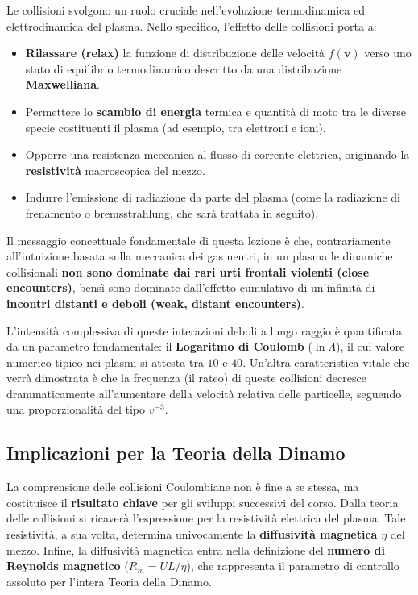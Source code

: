 Le collisioni svolgono un ruolo cruciale nell'evoluzione termodinamica ed elettrodinamica del plasma. Nello specifico, l'effetto delle collisioni porta a:
\begin{itemize}
\item \textbf{Rilassare (relax)} la funzione di distribuzione delle velocità $f(\mathbf{v})$ verso uno stato di equilibrio termodinamico descritto da una distribuzione \textbf{Maxwelliana}.
\item Permettere lo \textbf{scambio di energia} termica e quantità di moto tra le diverse specie costituenti il plasma (ad esempio, tra elettroni e ioni).
\item Opporre una resistenza meccanica al flusso di corrente elettrica, originando la \textbf{resistività} macroscopica del mezzo.
\item Indurre l'emissione di radiazione da parte del plasma (come la radiazione di frenamento o bremsstrahlung, che sarà trattata in seguito).
\end{itemize}

Il messaggio concettuale fondamentale di questa lezione è che, contrariamente all'intuizione basata sulla meccanica dei gas neutri, in un plasma le dinamiche collisionali \textbf{non sono dominate dai rari urti frontali violenti (close encounters)}, bensì sono dominate dall'effetto cumulativo di un'infinità di \textbf{incontri distanti e deboli (weak, distant encounters)}.

L'intensità complessiva di queste interazioni deboli a lungo raggio è quantificata da un parametro fondamentale: il \textbf{Logaritmo di Coulomb} ($\ln \Lambda$), il cui valore numerico tipico nei plasmi si attesta tra $10$ e $40$. Un'altra caratteristica vitale che verrà dimostrata è che la frequenza (il rateo) di queste collisioni decresce drammaticamente all'aumentare della velocità relativa delle particelle, seguendo una proporzionalità del tipo $v^{-3}$.

\subsection{Implicazioni per la Teoria della Dinamo}
La comprensione delle collisioni Coulombiane non è fine a se stessa, ma costituisce il \textbf{risultato chiave} per gli sviluppi successivi del corso. Dalla teoria delle collisioni si ricaverà l'espressione per la resistività elettrica del plasma. Tale resistività, a sua volta, determina univocamente la \textbf{diffusività magnetica} $\eta$ del mezzo. Infine, la diffusività magnetica entra nella definizione del \textbf{numero di Reynolds magnetico} ($R_m = UL/\eta$), che rappresenta il parametro di controllo assoluto per l'intera Teoria della Dinamo.

